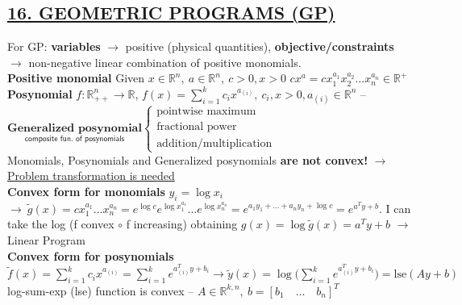 \documentclass[a4paper]{article}
\begin{document}
\subsection*{\color{cyan}
\textsf{
    \underline{16. GEOMETRIC PROGRAMS (GP)}}}
For GP: \textbf{variables} $\to$ positive (physical quantities), \textbf{objective/constraints} $\to$ non-negative linear combination of positive monomials.\\
\textbf{Positive monomial} Given $x\in\mathbb{R}^n,\ a \in \mathbb{R}^n, \ c>0, x>0$ $cx^a=cx_1^{a_1}x_2^{a_2}...x_n^{a_n}\in\mathbb{R}^+$\\
\textbf{Posynomial} $f:\mathbb{R}^n_{++}\to\mathbb{R}$, $f(x)=\sum_{i=1}^{k}{c_i x^{a_{(i)}}}, \ c_i, x>0, a_{(i)}\in\mathbb{R}^n$ -- $\underset{\textsf{composite fun. of posynomials}}{\textbf{Generalized posynomial}} \begin{cases}
    \text{pointwise maximum}\\
    \text{fractional power}\\
    \text{addition/multiplication}
\end{cases}$\\
Monomials, Posynomials and Generalized posynomials \textbf{are not convex!} $\to$ \underline{Problem transformation is needed}\\
\textbf{Convex form for monomials} $y_i=\log x_i$ $\to \ \tilde{g}(x)=cx_1^{a_1}...x_n^{a_n}=e^{\log c}e^{\log{x_1^{a_1}}}...e^{\log{x_n^{a_n}}}=e^{a_1{y_1}+...+a_n{y_n}+\log{c}}=e^{a^T{y}+b}$. I can take the log (f convex $\circ$ f increasing) obtaining $g(x)=\log{\tilde{g}(x)}=a^T{y}+b$ $\to$ Linear Program\\
\textbf{Convex form for posynomials} $\tilde{f}(x)=\sum_{i=1}^{k}{c_i{x}^{a_{(i)}}}=\sum_{i=1}^{k}{e^{a_{(i)}^T{y}+b_i}}\to
\tilde{y}(x)=\log\bigg({\sum_{i=1}^{k}{e^{a_{(i)}^T{y}+b_i}}}\bigg)=\text{lse}(Ay+b)$\\
log-sum-exp (lse) function is convex -- $A\in\mathbb{R}^{k,n}, \ b = [b_1 \quad \dots \quad b_n]^T$\\
\newpage
\end{document}
